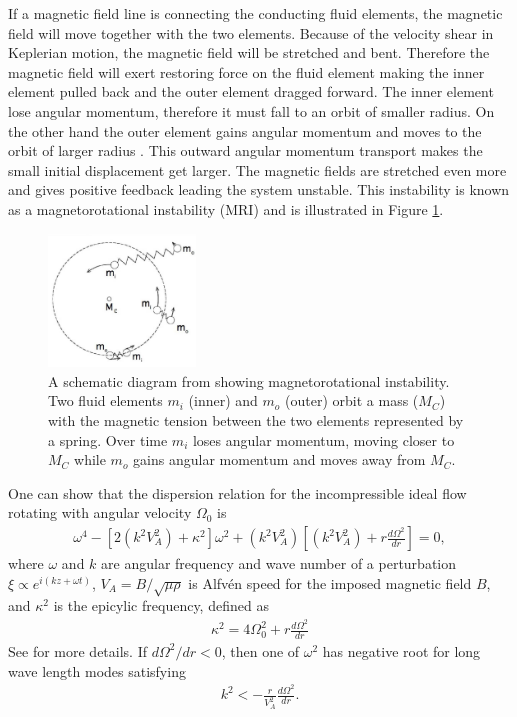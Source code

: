 \documentclass{jfm}
\begin{document}
If a magnetic field line is connecting the conducting fluid elements, the 
magnetic field will move together with the two elements. Because of the velocity
shear in Keplerian motion, the magnetic field will be stretched and bent. 
Therefore the magnetic field will exert restoring force on the fluid element 
making the inner element pulled back and the outer element dragged forward. 
The inner element lose angular momentum, therefore it must fall to an orbit of
smaller radius. On the other hand the outer element gains angular momentum and
moves to the orbit of larger radius \cite[see][]{Balbus2011,Wiki:MRI}. This 
outward angular momentum transport makes the small initial displacement get 
larger. The magnetic fields are stretched even more and gives positive feedback
leading the system unstable. This instability is known as a magnetorotational 
instability (MRI) and is illustrated in Figure \ref{fig:mri}.

\begin{figure}[t]
    \centering
    \includegraphics[width=0.35\textwidth]{Balbus2009_diagram}
        \caption{A schematic diagram from \cite{Balbus2011} showing magnetorotational instability. Two fluid elements $m_i$ (inner) and $m_o$ (outer) orbit a mass ($M_C$) with the magnetic tension between the two elements represented by a spring. Over time $m_i$ loses angular momentum, moving closer to $M_C$ while $m_o$ gains angular momentum and moves away from $M_C$.}
        \label{fig:mri}
\end{figure}

One can show that the dispersion relation for the incompressible ideal flow 
rotating with angular velocity $\Omega_0$ is
\begin{align}
    \omega^4-\left[2\left(k^2 V_A^2\right) +\kappa^2\right]\omega^2 +\left(k^2 V_A^2\right)\left[\left(k^2 V_A^2\right)+r\frac{d \Omega^2}{dr}\right]=0,
\end{align}
where $\omega$ and $k$ are angular frequency and wave number of a perturbation
$\xi \propto e^{i(k z+\omega t)}$, $V_A = B / \sqrt{\mu \rho}$ is Alfv\'en speed
for the imposed magnetic field $B$, and $\kappa^2$ is the epicylic frequency, 
defined as
\begin{align}
    \kappa^2=4\Omega_0^2 + r \frac{d \Omega^2}{dr}
\end{align}
See \cite{Balbus1991,Balbus1998,Balbus2003} for more details. If 
$d \Omega^2 / dr < 0$, then one of $\omega^2$ has negative root for long wave 
length modes satisfying
\begin{align}
    k^2 < -\frac{r}{V_A^2}\frac{d\Omega^2}{dr}.
\end{align}
\end{document}
